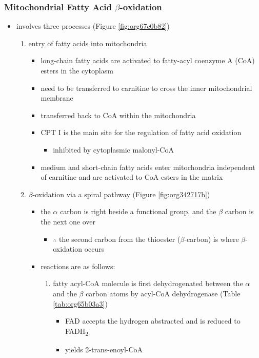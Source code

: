 \documentclass[12pt]{scrartcl}
\begin{document}
\subsubsection{Mitochondrial Fatty Acid \(\beta\)-oxidation}
\label{sec:org3389191}
\begin{itemize}
\item involves three processes (Figure \ref{fig:org67c0b82})
\begin{enumerate}
\item entry of fatty acids into mitochondria
\begin{itemize}
\item long-chain fatty acids are activated to fatty-acyl coenzyme A (CoA) esters
in the cytoplasm
\item need to be transferred to carnitine to cross the inner
mitochondrial membrane
\item transferred back to CoA within the mitochondria
\item CPT I is the main site for the regulation of fatty acid
oxidation
\begin{itemize}
\item inhibited by cytoplasmic malonyl-CoA
\end{itemize}
\item medium and short-chain fatty acids enter mitochondria
independent of carnitine and are activated to CoA esters in the
matrix
\end{itemize}
\item \(\beta\)-oxidation via a spiral pathway (Figure \ref{fig:org342717b})
\begin{itemize}
\item the \(\alpha\) carbon is right beside a functional group, and the
\(\beta\) carbon is the next one over
\begin{itemize}
\item \(\therefore\) the second carbon from the thioester (\(\beta\)-carbon) is where
\(\beta\)-oxidation occurs
\end{itemize}
\item reactions are as follows:
\begin{enumerate}
\item fatty acyl-CoA molecule is first dehydrogenated between the \(\alpha\)
and the \(\beta\) carbon atoms by acyl-CoA dehydrogenase (Table \ref{tab:org65b03a3})
\begin{itemize}
\item FAD accepts the hydrogen abstracted and is reduced to FADH\textsubscript{2}
\item yields 2-trans-enoyl-CoA

\end{itemize}
\end{enumerate}
\end{itemize}
\end{enumerate}
\end{itemize}
\end{document}
